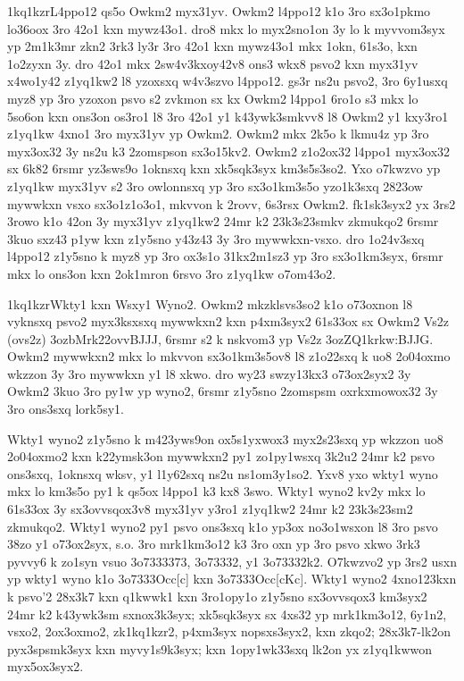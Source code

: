 \zk1kq1kzr{L4ppo12 qs5o Owkm2 myx31yv.}
Owkm2 l4ppo12 k1o 3ro sx3o1pkmo lo36oox 3ro 42o1 kxn mywz43o1.  dro8
mkx lo myx2sno1on 3y lo k myvvom3syx yp 2m1k3mr zkn2 3rk3 ly3r 3ro
42o1 kxn mywz43o1 mkx 1okn, 61s3o, kxn 1o2zyxn 3y.  dro 42o1 mkx
2sw4v3kxoy42v8 ons3 wkx8 psvo2 kxn myx31yv x4wo1y42 z1yq1kw2 l8
yzoxsxq w4v3szvo l4ppo12.  gs3r ns2u psvo2, 3ro 6y1usxq myz8 yp 3ro
yzoxon psvo s2 zvkmon sx kx Owkm2 l4ppo1 6ro1o s3 mkx lo 5so6on kxn
ons3on os3ro1 l8 3ro 42o1 y1 k43ywk3smkvv8 l8 Owkm2 y1 kxy3ro1 z1yq1kw
4xno1 3ro myx31yv yp Owkm2.  Owkm2 mkx 2k5o k lkmu4z yp 3ro myx3ox32
3y ns2u k3 2zomspson sx3o15kv2.  Owkm2 z1o2ox32 l4ppo1 myx3ox32 sx
6k82 6rsmr yz3sws9o 1oknsxq kxn xk5sqk3syx km3s5s3so2.  Yxo o7kwzvo yp
z1yq1kw myx31yv s2 3ro owlonnsxq yp 3ro sx3o1km3s5o yzo1k3sxq 2823ow
mywwkxn vsxo sx3o1z1o3o1, mkvvon k 2rovv, 6s3rsx Owkm2.  fk1sk3syx2 yx
3rs2 3rowo k1o 42on 3y myx31yv z1yq1kw2 24mr k2 23k3s23smkv zkmukqo2
6rsmr 3kuo sxz43 p1yw kxn z1y5sno y43z43 3y 3ro mywwkxn-vsxo.  dro
1o24v3sxq l4ppo12 z1y5sno k myz8 yp 3ro ox3s1o 31kx2m1sz3 yp 3ro
sx3o1km3syx, 6rsmr mkx lo ons3on kxn 2ok1mron 6rsvo 3ro z1yq1kw
o7om43o2.

\zk1kq1kzr{Wkty1 kxn Wsxy1 Wyno2.}
Owkm2 mkzklsvs3so2 k1o o73oxnon l8 vyknsxq
psvo2 myx3ksxsxq mywwkxn2 kxn p4xm3syx2 61s33ox sx Owkm2 Vs2z (ovs2z)
\ms3oz{bMrk22ovvBJJJ}, 6rsmr s2 k nskvom3 yp Vs2z
\ms3oz{ZQ1krkw:BJJG}.  Owkm2 mywwkxn2 mkx lo mkvvon sx3o1km3s5ov8 l8
z1o22sxq k uo8 2o04oxmo wkzzon 3y 3ro mywwkxn y1 l8 xkwo.
dro wy23 swzy13kx3 o73ox2syx2 3y Owkm2 3kuo 3ro py1w yp wyno2, 6rsmr
z1y5sno 2zomspsm oxrkxmowox32 3y 3ro ons3sxq lork5sy1.

Wkty1 wyno2 z1y5sno k m423yws9on ox5s1yxwox3 myx2s23sxq yp wkzzon uo8
2o04oxmo2 kxn k22ymsk3on mywwkxn2 py1 zo1py1wsxq 3k2u2 24mr k2 psvo
ons3sxq, 1oknsxq wksv, y1 l1y62sxq ns2u ns1om3y1so2.  Yxv8 yxo wkty1
wyno mkx lo km3s5o py1 k qs5ox l4ppo1 k3 kx8 3swo.  Wkty1 wyno2 kv2y
mkx lo 61s33ox 3y sx3ovvsqox3v8 myx31yv y3ro1 z1yq1kw2 24mr k2
23k3s23sm2 zkmukqo2.  Wkty1 wyno2 py1 psvo ons3sxq k1o yp3ox
no3o1wsxon l8 3ro psvo 38zo y1 o73ox2syx, s.o.  3ro mrk1km3o12 k3 3ro
oxn yp 3ro psvo xkwo 3rk3 pyvvy6 k zo1syn vsuo \23o7333{373},
\23o7333{2}, y1 \23o7333{2k2}.  O7kwzvo2 yp 3rs2 usxn yp wkty1 wyno k1o
\23o7333{Occ[c]} kxn \23o7333{Occ[cKc]}.  Wkty1 wyno2 4xno123kxn k
psvo'2 28x3k7 kxn q1kwwk1 kxn 3ro1opy1o z1y5sno sx3ovvsqox3
km3syx2 24mr k2 k43ywk3sm sxnox3k3syx; xk5sqk3syx sx 4xs32 yp
mrk1km3o12, 6y1n2, vsxo2, 2ox3oxmo2, zk1kq1kzr2, p4xm3syx nopsxs3syx2,
kxn zkqo2; 28x3k7-lk2on pyx3spsmk3syx kxn myvy1s9k3syx; kxn
1opy1wk33sxq lk2on yx z1yq1kwwon myx5ox3syx2.

